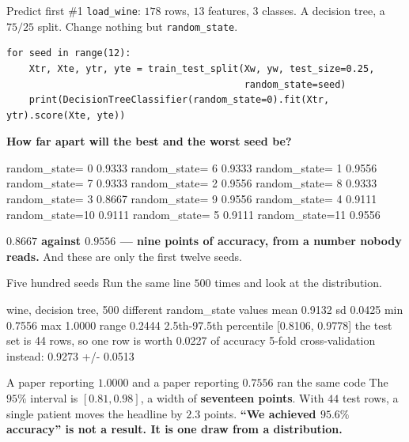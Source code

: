 \documentclass[aspectratio=169]{beamer}
\begin{document}
\begin{frame}[fragile,shrink=8]{Predict first \#1}
\texttt{load\_wine}: $178$ rows, $13$ features, $3$ classes. A decision tree,
a $75/25$ split. Change nothing but \texttt{random\_state}.
\begin{lstlisting}
for seed in range(12):
    Xtr, Xte, ytr, yte = train_test_split(Xw, yw, test_size=0.25,
                                          random_state=seed)
    print(DecisionTreeClassifier(random_state=0).fit(Xtr, ytr).score(Xte, yte))
\end{lstlisting}

\begin{center}
  \textbf{How far apart will the best and the worst seed be?}
\end{center}
\begin{outblk}
   random_state= 0  0.9333     random_state= 6  0.9333
   random_state= 1  0.9556     random_state= 7  0.9333
   random_state= 2  0.9556     random_state= 8  0.9333
   random_state= 3  0.8667     random_state= 9  0.9556
   random_state= 4  0.9111     random_state=10  0.9111
   random_state= 5  0.9111     random_state=11  0.9556
\end{outblk}
\begin{center}\small
  \textbf{$0.8667$ against $0.9556$ --- nine points of accuracy, from a
  number nobody reads.} And these are only the first twelve seeds.
\end{center}
\end{frame}

\begin{frame}[fragile,shrink=8]{Five hundred seeds}
Run the same line $500$ times and look at the distribution.
\begin{outblk}
wine, decision tree, 500 different random_state values
   mean 0.9132   sd 0.0425   min 0.7556   max 1.0000   range 0.2444
   2.5th-97.5th percentile [0.8106, 0.9778]
   the test set is 44 rows, so one row is worth 0.0227 of accuracy
   5-fold cross-validation instead: 0.9273  +/- 0.0513
\end{outblk}
\begin{alertblock}{A paper reporting $1.0000$ and a paper reporting $0.7556$
  ran the same code}
  \footnotesize The $95\%$ interval is $[0.81, 0.98]$, a width of
  \textbf{seventeen points}. With $44$ test rows, a single patient moves the
  headline by $2.3$ points. \textbf{``We achieved $95.6\%$ accuracy'' is not
  a result. It is one draw from a distribution.}
\end{alertblock}
\end{frame}
\end{document}
